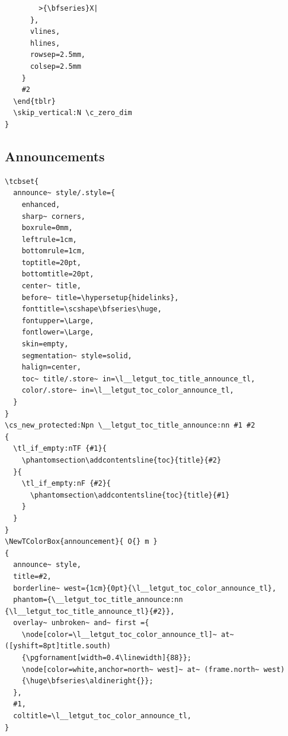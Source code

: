 \documentclass{letgut}
\begin{document}
\begin{lstlisting}
        >{\bfseries}X|
      },
      vlines,
      hlines,
      rowsep=2.5mm,
      colsep=2.5mm
    }
    #2
  \end{tblr}
  \skip_vertical:N \c_zero_dim
}
\end{lstlisting}
\subsection{Announcements}
\label{ImplementationAnnounces-nahckb909pj0}
\begin{lstlisting}
\tcbset{
  announce~ style/.style={
    enhanced,
    sharp~ corners,
    boxrule=0mm,
    leftrule=1cm,
    bottomrule=1cm,
    toptitle=20pt,
    bottomtitle=20pt,
    center~ title,
    before~ title=\hypersetup{hidelinks},
    fonttitle=\scshape\bfseries\huge,
    fontupper=\Large,
    fontlower=\Large,
    skin=empty,
    segmentation~ style=solid,
    halign=center,
    toc~ title/.store~ in=\l__letgut_toc_title_announce_tl,
    color/.store~ in=\l__letgut_toc_color_announce_tl,
  }
}
\cs_new_protected:Npn \__letgut_toc_title_announce:nn #1 #2
{
  \tl_if_empty:nTF {#1}{
    \phantomsection\addcontentsline{toc}{title}{#2}
  }{
    \tl_if_empty:nF {#2}{
      \phantomsection\addcontentsline{toc}{title}{#1}
    }
  }
}
\NewTColorBox{announcement}{ O{} m }
{
  announce~ style,
  title=#2,
  borderline~ west={1cm}{0pt}{\l__letgut_toc_color_announce_tl},
  phantom={\__letgut_toc_title_announce:nn {\l__letgut_toc_title_announce_tl}{#2}},
  overlay~ unbroken~ and~ first ={
    \node[color=\l__letgut_toc_color_announce_tl]~ at~ ([yshift=8pt]title.south)
    {\pgfornament[width=0.4\linewidth]{88}};
    \node[color=white,anchor=north~ west]~ at~ (frame.north~ west)
    {\huge\bfseries\aldineright{}};
  },
  #1,
  coltitle=\l__letgut_toc_color_announce_tl,
}
\end{lstlisting}
\end{document}

